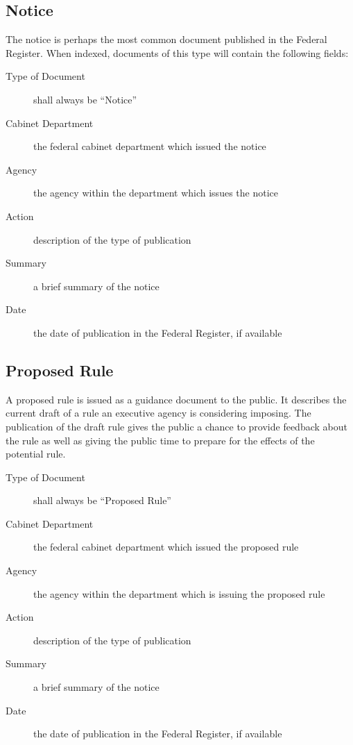 \documentclass{sig-alternate-05-2015}
\begin{document}
\subsection{Notice}
The notice is perhaps the most common document published in the Federal Register. When indexed, documents of this type will contain the following fields:
\begin{description}
\item[Type of Document] shall always be ``Notice''
\item[Cabinet Department] the federal cabinet department which issued the notice
\item[Agency] the agency within the department which issues the notice
\item[Action] description of the type of publication
\item[Summary] a brief summary of the notice
\item[Date] the date of publication in the Federal Register, if available
\end{description}

\subsection{Proposed Rule}
A proposed rule is issued as a guidance document to the public. It describes the current draft of a rule an executive agency is considering imposing. The publication of the draft rule gives the public a chance to provide feedback about the rule as well as giving the public time to prepare for the effects of the potential rule.
\begin{description}
\item[Type of Document] shall always be ``Proposed Rule''
\item[Cabinet Department] the federal cabinet department which issued the proposed rule
\item[Agency] the agency within the department which is issuing the proposed rule
\item[Action] description of the type of publication
\item[Summary] a brief summary of the notice
\item[Date] the date of publication in the Federal Register, if available
\end{description}
\end{document}

